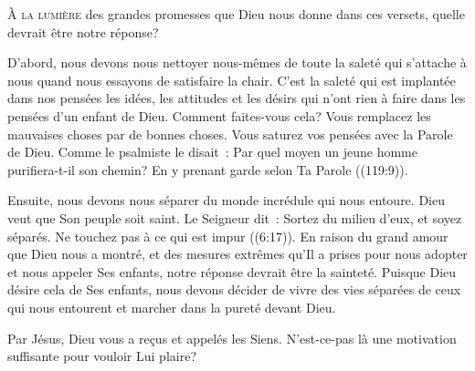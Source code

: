 


\lettrine{À}{ la lumière} des grandes promesses que Dieu nous donne
 dans ces versets, quelle devrait être notre réponse? 

D'abord, nous devons nous nettoyer nous-mêmes de toute la saleté
 qui s'attache à nous quand nous essayons de satisfaire la chair.
 C'est la saleté qui est implantée dans nos pensées
 \ocadr les idées, les attitudes et les désirs qui n'ont rien à faire
 dans les pensées d'un enfant de Dieu. Comment faites-vous cela?
 Vous remplacez les mauvaises choses par de bonnes choses.
 Vous saturez vos pensées avec la Parole de Dieu.
 Comme le psalmiste le disait~: 
 \og Par quel moyen un jeune homme purifiera-t-il son chemin?
 En y prenant garde selon Ta Parole \fg{} ((119:9)).


Ensuite, nous devons nous séparer du monde incrédule qui nous entoure.
 Dieu veut que Son peuple soit saint. Le Seigneur dit~: 
 \og Sortez du milieu d’eux, et soyez séparés.
 Ne touchez pas à ce qui est impur \fg{} ((6:17)).
 En raison du grand amour que Dieu nous a montré,
 et des mesures extrêmes qu'Il a prises pour nous adopter
 et nous appeler Ses enfants, notre réponse devrait être la sainteté.
 Puisque Dieu désire cela de Ses enfants, nous devons décider de vivre
 des vies séparées de ceux qui nous entourent et marcher dans la pureté
 devant Dieu.

Par Jésus, Dieu vous a reçus et appelés les Siens.
 N'est-ce-pas là une motivation suffisante pour vouloir Lui plaire?

\dvrule





